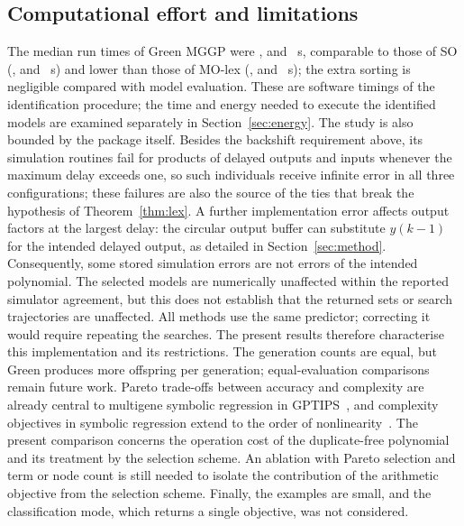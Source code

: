 \subsection{Computational effort and limitations}
The median run times of Green MGGP were \EBGreenTime, \ECGreenTime{} and \EDGreenTime~s, comparable to those of SO
(\EBSOTime, \ECSOTime{} and \EDSOTime~s) and lower than those of MO-lex (\EBLexTime, \ECLexTime{} and \EDLexTime~s); the
extra sorting is negligible compared with model evaluation. These are software timings of the identification
procedure; the time and energy needed to execute the identified models are examined separately in
Section~\ref{sec:energy}. The study is also bounded by the package itself. Besides the backshift requirement above, its
simulation routines fail for products of delayed outputs and inputs whenever the maximum delay exceeds one, so such
individuals receive infinite error in all three configurations; these failures are also the source of the ties that
break the hypothesis of Theorem~\ref{thm:lex}. A further implementation error affects output factors at the largest delay: the circular output buffer can substitute $y(k-1)$ for the intended delayed output, as detailed in Section~\ref{sec:method}. Consequently, some stored simulation errors are not errors of the intended polynomial. The selected models are numerically unaffected within the reported simulator agreement, but this does not establish that the returned sets or search trajectories are unaffected. All methods use the same predictor; correcting it would require repeating the searches. The present results therefore characterise this implementation and its restrictions.
The generation counts are equal, but Green produces more offspring per generation; equal-evaluation comparisons remain future work. Pareto trade-offs between accuracy and complexity are already central to multigene symbolic regression in GPTIPS~\cite{Searson2015}, and complexity objectives in symbolic regression extend to the order of nonlinearity~\cite{VSH2009}. The present comparison concerns the operation cost of the duplicate-free polynomial and its treatment by the selection scheme. An ablation with Pareto selection and term or node count is still needed to isolate the contribution of the arithmetic objective from the selection scheme. Finally, the examples are small, and
the classification mode, which returns a single objective, was not considered.
